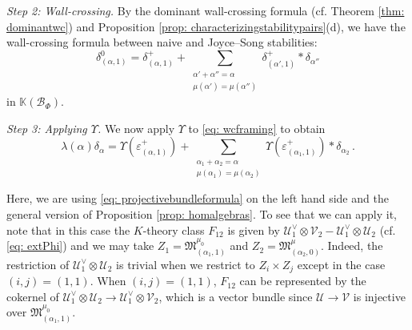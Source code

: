 \documentclass[12pt]{amsart}
\theoremstyle{definition}
\newcommand{\BK}{{\mathbb{K}}}
\newcommand{\CB}{{\mathcal B}}
\newcommand{\CU}{{\mathcal U}}
\newcommand{\CV}{{\mathcal V}}
\newcommand{\1}{\mathbf 1}
\newcommand{\FM}{{\mathfrak{M}}}
\begin{document}
\textit{Step 2: Wall-crossing.} By the dominant wall-crossing formula (cf. Theorem \ref{thm: dominantwc}) and Proposition \ref{prop: characterizingstabilitypairs}(d), we have the wall-crossing formula between naive and Joyce--Song stabilities:
\begin{equation}\label{eq: wcframing}
\delta_{(\alpha,1)}^0 = \delta_{(\alpha, 1)}^+ +\sum_{\substack{\alpha'+\alpha''=\alpha\\
\mu(\alpha')=\mu(\alpha'')}} \delta_{(\alpha',1)}^+ * \delta_{\alpha''}\end{equation}
in $\BK(\CB_\Phi)$. 

\textit{Step 3: Applying $\Upsilon$.} We now apply $\Upsilon$ to \eqref{eq: wcframing} to obtain
\begin{equation}\label{eq: wcframingupsilon}\lambda(\alpha)\delta_{\alpha} = \Upsilon(\varepsilon_{(\alpha,1)}^+) +\sum_{\substack{\alpha_1+\alpha_2=\alpha\\
\mu(\alpha_1)=\mu(\alpha_2)}} \Upsilon(\varepsilon_{(\alpha_1,1)}^+) * \delta_{\alpha_2}\,.\end{equation}

Here, we are using \eqref{eq: projectivebundleformula} on the left hand side and the general version of Proposition \ref{prop: homalgebras}. To see that we can apply it, note that in this case the $K$-theory class $F_{12}$ is given by $\CU_1^\vee\otimes \CV_2-\CU_1^\vee\otimes \CU_2$ 
(cf. \eqref{eq: extPhi}) and we may take $Z_1=\FM_{(\alpha_1, 1)}^{\mu_0}$ and $Z_2=\FM_{(\alpha_2, 0)}^{\mu}$. Indeed, the restriction of $\CU_1^\vee\otimes \CU_2$ is trivial when we restrict to $Z_i\times Z_j$ except in the case $(i, j)=(1,1)$. When $(i, j)=(1,1)$, $F_{12}$ can be represented by the cokernel of $\CU_1^\vee\otimes \CU_2\to \CU_1^\vee\otimes \CV_2$, which is a vector bundle since $\CU\to \CV$ is injective over $\FM^{\mu_0}_{(\alpha_1, 1)}$.
\end{document}
